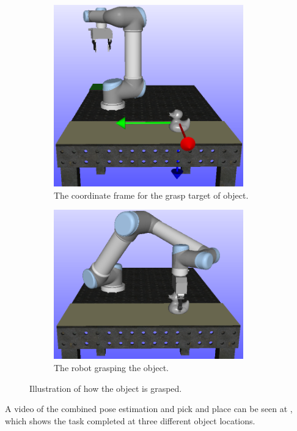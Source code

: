 \documentclass[../main.tex]{subfiles}
\begin{document}
\begin{figure}[H]
\begin{subfigure}[t]{0.275\textwidth}
        \includegraphics[width=0.9\textwidth]{figures/combi/grasp_target_axis.png}
        \caption{The coordinate frame for the grasp target of object.}
        \label{subfig:grasp_target_axis}
    \end{subfigure}
    \begin{subfigure}[t]{0.33\textwidth}
        \centering
        \captionsetup{width=0.9\textwidth}
        \includegraphics[width=0.9\textwidth]{figures/combi/grasped_object.png}
        \caption{The robot grasping the object.}
        \label{subfig:grasped_object}
    \end{subfigure}
    \caption{Illustration of how the object is grasped.}
    \label{fig:grasping_object}
\end{figure}
A video of the combined pose estimation and pick and place can be seen at \cite{combi_vid}, which shows the task completed at three different object locations.
\end{document}
